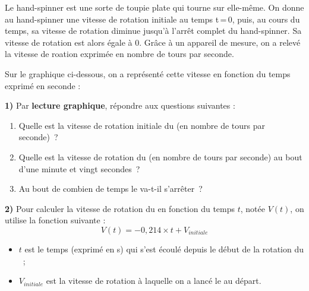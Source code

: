 \documentclass[exercice]{thedocument}%
\begin{document}
%
\begin{minipage}[t]{.75\linewidth}
    Le hand-spinner est une sorte de toupie plate qui tourne sur elle-même.
\vskip10pt\noindent
On donne au hand-spinner une vitesse de rotation initiale au temps
t\,=\,0, puis, au cours du temps, sa vitesse de rotation diminue jusqu'à
l'arrêt complet du hand-spinner. Sa vitesse de rotation est alors égale à 0.%
\vskip5pt\noindent
Grâce à un appareil de mesure, on a relevé la vitesse de roation exprimée en
nombre de tours par seconde.
\vskip5pt\noindent
\end{minipage}%
\begin{minipage}[t]{.25\linewidth}
\end{minipage}
Sur le graphique ci-dessous, on a représenté cette vitesse en fonction du
temps exprimé en seconde :\vskip5pt
{\centering
\par}\noindent
{\bfseries 1) }Par {\bfseries lecture graphique}, répondre aux questions suivantes : 
\begin{enumerate}
    \item Quelle est la vitesse de rotation initiale du  (en
    nombre de tours par seconde)~?
    \item Quelle est la vitesse de rotation du  (en nombre
    de tours par seconde) au bout d'une minute et vingt secondes~?
    \item Au bout de combien de temps le  va-t-il s'arrêter~?
\end{enumerate}\noindent
{\bfseries 2) }Pour calculer la vitesse de rotation du  en fonction du temps
$t$, notée $V(t)$, on utilise la fonction suivante : $$V(t) = -0,214
\times t + V_{initiale}$$
\begin{itemize}
    \item $t$ est le temps (exprimé en s) qui s'est écoulé depuis le début de
    la rotation du ~; 
    \item $V_{initiale}$ est la vitesse de rotation à laquelle on a lancé le
     au départ.
\end{itemize}
\end{document}
